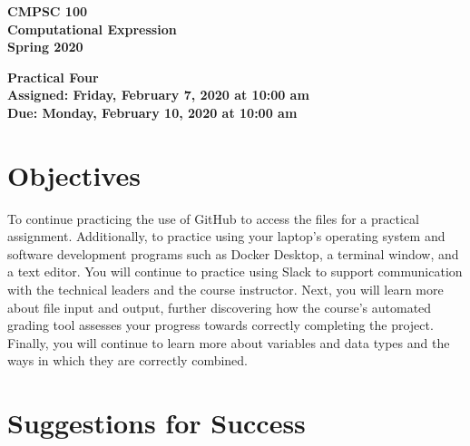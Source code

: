 \documentclass[11pt]{article}
\newcommand{\assignmentduedate}{February 10}
\newcommand{\assignmentassignedate}{February 7}
\newcommand{\assignmentnumber}{Four}
\newcommand{\labyear}{2020}
\newcommand{\labdueday}{Monday}
\newcommand{\labassignday}{Friday}
\newcommand{\labtime}{10:00 am}
\newcommand{\assigneddate}{Assigned: \labassignday, \assignmentassignedate, \labyear{} at \labtime{}}
\newcommand{\duedate}{Due: \labdueday, \assignmentduedate, \labyear{} at \labtime{}}
\newcommand{\labtitle}[1]
{
  \begin{center}
    \begin{center}
      \bf
      CMPSC 100\\Computational Expression\\
      Spring 2020\\
      \medskip
    \end{center}
    \bf
    #1
  \end{center}
}
\begin{document}
\thispagestyle{empty}

\labtitle{Practical \assignmentnumber{} \\ \assigneddate{} \\ \duedate{}}

\section*{Objectives}

To continue practicing the use of GitHub to access the files for a practical
assignment. Additionally, to practice using your laptop's operating system and
software development programs such as Docker Desktop, a terminal window, and a
text editor. You will continue to practice using Slack to support communication
with the technical leaders and the course instructor. Next, you will learn more
about file input and output, further discovering how the course's automated
grading tool assesses your progress towards correctly completing the project.
Finally, you will continue to learn more about variables and data types and the
ways in which they are correctly combined.

\section*{Suggestions for Success}
\end{document}

